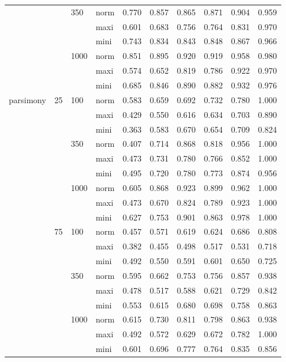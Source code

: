 \begin{longtable}{llllrrrrrr}
   &  & 350 & norm & 0.770 & 0.857 & 0.865 & 0.871 & 0.904 & 0.959 \\ 
   &  &  & maxi & 0.601 & 0.683 & 0.756 & 0.764 & 0.831 & 0.970 \\ 
   &  &  & mini & 0.743 & 0.834 & 0.843 & 0.848 & 0.867 & 0.966 \\ 
   &  & 1000 & norm & 0.851 & 0.895 & 0.920 & 0.919 & 0.958 & 0.980 \\ 
   &  &  & maxi & 0.574 & 0.652 & 0.819 & 0.786 & 0.922 & 0.970 \\ 
   &  &  & mini & 0.685 & 0.846 & 0.890 & 0.882 & 0.932 & 0.976 \\ 
  parsimony & 25 & 100 & norm & 0.583 & 0.659 & 0.692 & 0.732 & 0.780 & 1.000 \\ 
   &  &  & maxi & 0.429 & 0.550 & 0.616 & 0.634 & 0.703 & 0.890 \\ 
   &  &  & mini & 0.363 & 0.583 & 0.670 & 0.654 & 0.709 & 0.824 \\ 
   &  & 350 & norm & 0.407 & 0.714 & 0.868 & 0.818 & 0.956 & 1.000 \\ 
   &  &  & maxi & 0.473 & 0.731 & 0.780 & 0.766 & 0.852 & 1.000 \\ 
   &  &  & mini & 0.495 & 0.720 & 0.780 & 0.773 & 0.874 & 0.956 \\ 
   &  & 1000 & norm & 0.605 & 0.868 & 0.923 & 0.899 & 0.962 & 1.000 \\ 
   &  &  & maxi & 0.473 & 0.670 & 0.824 & 0.789 & 0.923 & 1.000 \\ 
   &  &  & mini & 0.627 & 0.753 & 0.901 & 0.863 & 0.978 & 1.000 \\ 
   & 75 & 100 & norm & 0.457 & 0.571 & 0.619 & 0.624 & 0.686 & 0.808 \\ 
   &  &  & maxi & 0.382 & 0.455 & 0.498 & 0.517 & 0.531 & 0.718 \\ 
   &  &  & mini & 0.492 & 0.550 & 0.591 & 0.601 & 0.650 & 0.725 \\ 
   &  & 350 & norm & 0.595 & 0.662 & 0.753 & 0.756 & 0.857 & 0.938 \\ 
   &  &  & maxi & 0.478 & 0.517 & 0.588 & 0.621 & 0.729 & 0.842 \\ 
   &  &  & mini & 0.553 & 0.615 & 0.680 & 0.698 & 0.758 & 0.863 \\ 
   &  & 1000 & norm & 0.615 & 0.730 & 0.811 & 0.798 & 0.863 & 0.938 \\ 
   &  &  & maxi & 0.492 & 0.572 & 0.629 & 0.672 & 0.782 & 1.000 \\ 
   &  &  & mini & 0.601 & 0.696 & 0.777 & 0.764 & 0.835 & 0.856 \\ 

\end{longtable}
